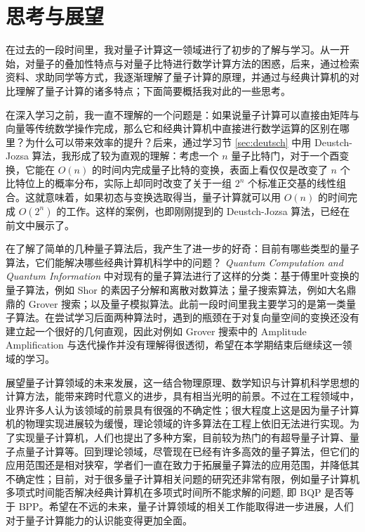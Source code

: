 \section{思考与展望}

在过去的一段时间里，我对量子计算这一领域进行了初步的了解与学习。从一开始，对量子的叠加性特点与对量子比特进行数学计算方法的困惑，后来，通过检索资料、求助同学等方式，我逐渐理解了量子计算的原理，并通过与经典计算机的对比理解了量子计算的诸多特点；下面简要概括我对此的一些思考。

在深入学习之前，我一直不理解的一个问题是：如果说量子计算可以直接由矩阵与向量等传统数学操作完成，那么它和经典计算机中直接进行数学运算的区别在哪里？为什么可以带来效率的提升？后来，通过学习节 \ref{sec:deutsch} 中用 Deustch-Jozsa 算法，我形成了较为直观的理解：考虑一个 $n$ 量子比特门，对于一个酉变换，它能在 $O(n)$ 的时间内完成量子比特的变换，表面上看仅仅是改变了 $n$ 个比特位上的概率分布，实际上却同时改变了关于一组 $2^n$ 个标准正交基的线性组合。这就意味着，如果初态与变换选取得当，量子计算就可以用 $O(n)$ 的时间完成 $O(2^n)$ 的工作。这样的案例，也即刚刚提到的 Deustch-Jozsa 算法，已经在前文中展示了。

在了解了简单的几种量子算法后，我产生了进一步的好奇：目前有哪些类型的量子算法，它们能解决哪些经典计算机科学中的问题？\textit{ Quantum Computation and Quantum Information}\cite{nielsen2002quantum} 中对现有的量子算法进行了这样的分类：基于傅里叶变换的量子算法，例如 Shor 的素因子分解和离散对数算法；量子搜索算法，例如大名鼎鼎的 Grover 搜索；以及量子模拟算法。此前一段时间里我主要学习的是第一类量子算法。在尝试学习后面两种算法时，遇到的瓶颈在于对复向量空间的变换还没有建立起一个很好的几何直观，因此对例如 Grover 搜索中的 Amplitude Amplification 与迭代操作并没有理解得很透彻，希望在本学期结束后继续这一领域的学习。

展望量子计算领域的未来发展，这一结合物理原理、数学知识与计算机科学思想的计算方法，能带来跨时代意义的进步，具有相当光明的前景。不过在工程领域中，业界许多人认为该领域的前景具有很强的不确定性；很大程度上这是因为量子计算机的物理实现进展较为缓慢，理论领域的许多算法在工程上依旧无法进行实现。为了实现量子计算机，人们也提出了多种方案，目前较为热门的有超导量子计算、量子点量子计算等。回到理论领域，尽管现在已经有许多高效的量子算法，但它们的应用范围还是相对狭窄，学者们一直在致力于拓展量子算法的应用范围，并降低其不确定性；目前，对于很多量子计算相关问题的研究还非常有限\cite{孙晓明2016量子计算若干前沿问题综述}，例如量子计算机多项式时间能否解决经典计算机在多项式时间所不能求解的问题, 即 BQP 是否等于 BPP。希望在不远的未来，量子计算领域的相关工作能取得进一步进展，人们对于量子计算能力的认识能变得更加全面。
